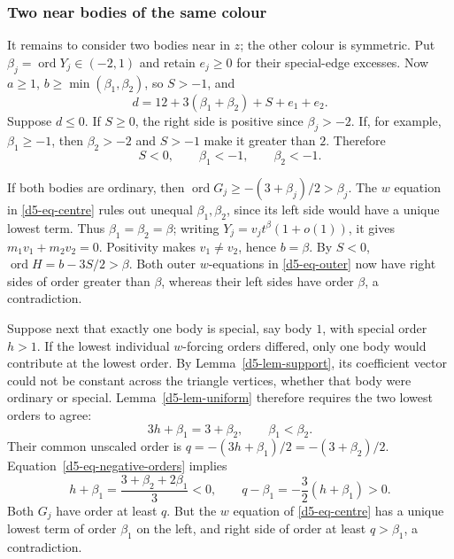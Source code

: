 \documentclass[11pt]{amsart}
\theoremstyle{definition}
\theoremstyle{remark}
\newcommand{\ord}{\operatorname{ord}}
\begin{document}
{\subsubsection{Two near bodies of the same colour}\label{d5-same-near}
It remains to consider two bodies near in $z$; the other colour is symmetric.
Put $\beta_j=\ord Y_j\in(-2,1)$ and retain $e_j\ge0$ for their special-edge
excesses.  Now $a\ge1$, $b\ge\min(\beta_1,\beta_2)$, so $S>-1$, and
\begin{equation}\label{d5-eq-same-product}
 d=12+3(\beta_1+\beta_2)+S+e_1+e_2.
\end{equation}
Suppose $d\le0$.  If $S\ge0$, the right side is positive since $\beta_j>-2$.
If, for example, $\beta_1\ge-1$, then $\beta_2>-2$ and $S>-1$ make it greater
than $2$.  Therefore
\begin{equation}\label{d5-eq-negative-orders}
 S<0,\qquad \beta_1<-1,\qquad \beta_2<-1.
\end{equation}

If both bodies are ordinary, then $\ord G_j\ge-(3+\beta_j)/2>\beta_j$.
The $w$ equation in \eqref{d5-eq-centre} rules out unequal $\beta_1,\beta_2$,
since its left side would have a unique lowest term.  Thus
$\beta_1=\beta_2=\beta$; writing $Y_j=v_jt^\beta(1+o(1))$, it gives
$m_1v_1+m_2v_2=0$.  Positivity makes $v_1\ne v_2$, hence $b=\beta$.
By $S<0$, $\ord H=b-3S/2>\beta$.  Both outer $w$-equations in
\eqref{d5-eq-outer} now have right sides of order greater than $\beta$, whereas
their left sides have order $\beta$, a contradiction.

Suppose next that exactly one body is special, say body $1$, with special
order $h>1$.  If the lowest individual $w$-forcing orders differed, only
one body would contribute at the lowest order.  By
Lemma~\ref{d5-lem-support}, its coefficient vector could not be constant
across the triangle vertices, whether that body were ordinary or special.
Lemma~\ref{d5-lem-uniform} therefore requires the two lowest orders to agree:
\[
 3h+\beta_1=3+\beta_2,\qquad \beta_1<\beta_2.
\]
Their common unscaled order is $q=-(3h+\beta_1)/2=-(3+\beta_2)/2$.
Equation~\eqref{d5-eq-negative-orders} implies
\[
 h+\beta_1=\frac{3+\beta_2+2\beta_1}{3}<0,\qquad
 q-\beta_1=-\frac32(h+\beta_1)>0.
\]
Both $G_j$ have order at least $q$.  But the $w$ equation of
\eqref{d5-eq-centre} has a unique lowest term of order $\beta_1$ on the left,
and right side of order at least $q>\beta_1$, a contradiction.

}
\end{document}
